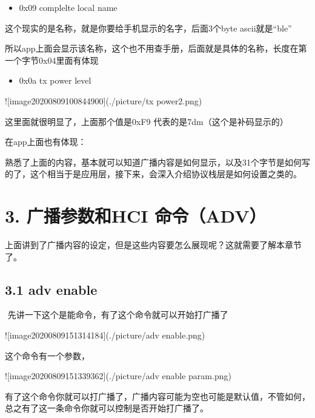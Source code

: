 \documentclass[letterpaper,10pt,english]{sphinxmanual}
\begin{document}
\begin{itemize}
\item {} 
0x09  complelte local name


\end{itemize}

这个现实的是名称，就是你要给手机显示的名字，后面3个byte ascii就是“ble”

所以app上面会显示该名称，这个也不用查手册，后面就是具体的名称，长度在第一个字节0x04里面有体现
\begin{itemize}
\item {} 
0x0a  tx power level


\end{itemize}

!{[}image\sphinxhyphen{}20200809100844900{]}(./picture/tx power2.png)

这里面就很明显了，上面那个值是0xF9 代表的是\sphinxhyphen{}7dm（这个是补码显示的）

在app上面也有体现：


熟悉了上面的内容，基本就可以知道广播内容是如何显示，以及31个字节是如何写的了，这个相当于是应用层，接下来，会深入介绍协议栈层是如何设置之类的。


\section{3. 广播参数和HCI 命令（ADV）}
\label{\detokenize{test/ble_adv_scan_all:hci-adv}}
​          上面讲到了广播内容的设定，但是这些内容要怎么展现呢？这就需要了解本章节了。


\subsection{3.1 adv enable}
\label{\detokenize{test/ble_adv_scan_all:adv-enable}}
​        先讲一下这个是能命令，有了这个命令就可以开始打广播了

!{[}image\sphinxhyphen{}20200809151314184{]}(./picture/adv enable.png)

这个命令有一个参数，

!{[}image\sphinxhyphen{}20200809151339362{]}(./picture/adv enable param.png)

有了这个命令你就可以打广播了，广播内容可能为空也可能是默认值，不管如何，总之有了这一条命令你就可以控制是否开始打广播了。
\end{document}
